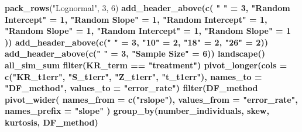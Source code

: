 \documentclass[12pt, twoside]{amherstthesis}
\newenvironment{Shaded}{\begin{snugshade}}{\end{snugshade}}
\newcommand{\DataTypeTok}[1]{\textcolor[rgb]{0.13,0.29,0.53}{#1}}
\newcommand{\DecValTok}[1]{\textcolor[rgb]{0.00,0.00,0.81}{#1}}
\newcommand{\KeywordTok}[1]{\textcolor[rgb]{0.13,0.29,0.53}{\textbf{#1}}}
\newcommand{\NormalTok}[1]{#1}
\newcommand{\OperatorTok}[1]{\textcolor[rgb]{0.81,0.36,0.00}{\textbf{#1}}}
\newcommand{\StringTok}[1]{\textcolor[rgb]{0.31,0.60,0.02}{#1}}
\begin{document}
\begin{Shaded}
\begin{Highlighting}[]
{{{{{{{{{{{{{{{{{{{{{{{{{{{{{{{{{{{{{{{{{{{{{\StringTok{  }\KeywordTok{pack_rows}\NormalTok{(}\StringTok{"Lognormal"}\NormalTok{, }\DecValTok{3}\NormalTok{, }\DecValTok{6}\NormalTok{) }\OperatorTok{%>%}
\StringTok{  }\KeywordTok{add_header_above}\NormalTok{(}\KeywordTok{c}\NormalTok{(}
    \StringTok{" "}\NormalTok{ =}\StringTok{ }\DecValTok{3}\NormalTok{, }\StringTok{"Random Intercept"}\NormalTok{ =}\StringTok{ }\DecValTok{1}\NormalTok{, }\StringTok{"Random Slope"}\NormalTok{ =}\StringTok{ }\DecValTok{1}\NormalTok{, }\StringTok{"Random Intercept"}\NormalTok{ =}\StringTok{ }\DecValTok{1}\NormalTok{,}
    \StringTok{"Random Slope"}\NormalTok{ =}\StringTok{ }\DecValTok{1}\NormalTok{, }\StringTok{"Random Intercept"}\NormalTok{ =}\StringTok{ }\DecValTok{1}\NormalTok{, }\StringTok{"Random Slope"}\NormalTok{ =}\StringTok{ }\DecValTok{1}
\NormalTok{  )) }\OperatorTok{%>%}
\StringTok{  }\KeywordTok{add_header_above}\NormalTok{(}\KeywordTok{c}\NormalTok{(}\StringTok{" "}\NormalTok{ =}\StringTok{ }\DecValTok{3}\NormalTok{, }\StringTok{"10"}\NormalTok{ =}\StringTok{ }\DecValTok{2}\NormalTok{, }\StringTok{"18"}\NormalTok{ =}\StringTok{ }\DecValTok{2}\NormalTok{, }\StringTok{"26"}\NormalTok{ =}\StringTok{ }\DecValTok{2}\NormalTok{)) }\OperatorTok{%>%}
\StringTok{  }\KeywordTok{add_header_above}\NormalTok{(}\KeywordTok{c}\NormalTok{(}\StringTok{" "}\NormalTok{ =}\StringTok{ }\DecValTok{3}\NormalTok{, }\StringTok{"Sample Size"}\NormalTok{ =}\StringTok{ }\DecValTok{6}\NormalTok{)) }\OperatorTok{%>%}
\StringTok{  }\KeywordTok{landscape}\NormalTok{()}
\NormalTok{all_sim_sum }\OperatorTok{%>%}
\StringTok{  }\KeywordTok{filter}\NormalTok{(KR_term }\OperatorTok{==}\StringTok{ "treatment"}\NormalTok{) }\OperatorTok{%>%}
\StringTok{  }\KeywordTok{pivot_longer}\NormalTok{(}\DataTypeTok{cols =} \KeywordTok{c}\NormalTok{(}\StringTok{"KR_t1err"}\NormalTok{, }\StringTok{"S_t1err"}\NormalTok{, }\StringTok{"Z_t1err"}\NormalTok{, }\StringTok{"t_t1err"}\NormalTok{), }
               \DataTypeTok{names_to =} \StringTok{"DF_method"}\NormalTok{, }\DataTypeTok{values_to =} \StringTok{"error_rate"}\NormalTok{) }\OperatorTok{%>%}
\StringTok{  }\KeywordTok{filter}\NormalTok{(DF_method }\OperatorTok{%in%}\StringTok{ }\KeywordTok{c}\NormalTok{(}\StringTok{"Z_t1err"}\NormalTok{, }\StringTok{"t_t1err"}\NormalTok{)) }\OperatorTok{%>%}
\StringTok{  }\KeywordTok{pivot_wider}\NormalTok{(}
    \DataTypeTok{names_from =} \KeywordTok{c}\NormalTok{(}\StringTok{"rslope"}\NormalTok{),}
    \DataTypeTok{values_from =} \StringTok{"error_rate"}\NormalTok{, }\DataTypeTok{names_prefix =} \StringTok{"slope"}
\NormalTok{  ) }\OperatorTok{%>%}
\StringTok{  }\KeywordTok{group_by}\NormalTok{(number_individuals, skew, kurtosis, DF_method) }\OperatorTok{%>%}
}}}}}}}}}}}}}}}}}}}}}}}}}}}}}}}}}}}}}}}}}}}}}}}}}}}}}}}
\end{Highlighting}
\end{Shaded}
\end{document}
